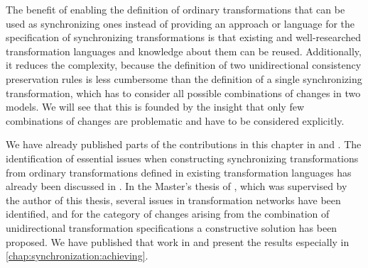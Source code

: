 
The benefit of enabling the definition of ordinary transformations that can be used as synchronizing ones instead of providing an approach or language for the specification of synchronizing transformations is that existing and well-researched transformation languages and knowledge about them can be reused.
Additionally, it reduces the complexity, because the definition of two unidirectional consistency preservation rules is less cumbersome than the definition of a single synchronizing transformation, which has to consider all possible combinations of changes in two models.
We will see that this is founded by the insight that only few combinations of changes are problematic and have to be considered explicitly.

We have already published parts of the contributions in this chapter in \cite{klare2018docsym} and \cite{klare2019icmt}.
The identification of essential issues when constructing synchronizing transformations from ordinary transformations defined in existing transformation languages has already been discussed in \cite{klare2018docsym}.
In the Master's thesis of \textcite{syma2018ma}, which was supervised by the author of this thesis, several issues in transformation networks have been identified, and for the category of changes arising from the combination of unidirectional transformation specifications a constructive solution has been proposed.
We have published that work in \cite{klare2019icmt} and present the results especially in \autoref{chap:synchronization:achieving}.





